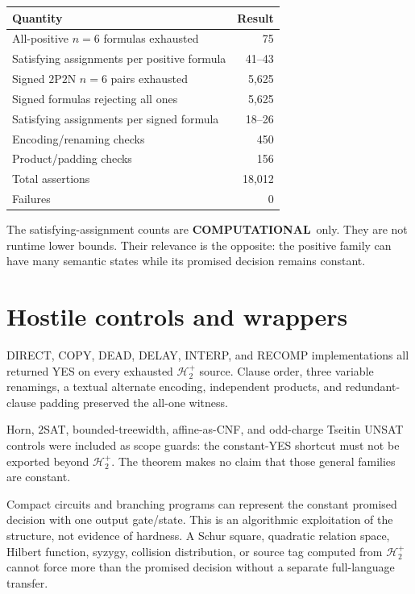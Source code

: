 \documentclass[11pt]{article}
\newcommand{\Hplus}{\mathcal H^{+}_{2}}
\newcommand{\COMP}{\textbf{COMPUTATIONAL}}
\begin{document}
\begin{center}
\begin{tabular}{@{}lr@{}}
\toprule
Quantity & Result\\
\midrule
All-positive $n=6$ formulas exhausted & 75\\
Satisfying assignments per positive formula & 41--43\\
Signed $2$P$2$N $n=6$ pairs exhausted & 5,625\\
Signed formulas rejecting all ones & 5,625\\
Satisfying assignments per signed formula & 18--26\\
Encoding/renaming checks & 450\\
Product/padding checks & 156\\
Total assertions & 18,012\\
Failures & 0\\
\bottomrule
\end{tabular}
\end{center}

The satisfying-assignment counts are \COMP\ only.  They are not runtime
lower bounds.  Their relevance is the opposite: the positive family can
have many semantic states while its promised decision remains constant.

\section{Hostile controls and wrappers}

DIRECT, COPY, DEAD, DELAY, INTERP, and RECOMP implementations all returned
YES on every exhausted $\Hplus$ source.  Clause order, three variable
renamings, a textual alternate encoding, independent products, and
redundant-clause padding preserved the all-one witness.

Horn, $2$SAT, bounded-treewidth, affine-as-CNF, and odd-charge Tseitin
UNSAT controls were included as scope guards: the constant-YES shortcut
must not be exported beyond $\Hplus$.  The theorem makes no claim that
those general families are constant.

Compact circuits and branching programs can represent the constant
promised decision with one output gate/state.  This is an algorithmic
exploitation of the structure, not evidence of hardness.  A Schur square,
quadratic relation space, Hilbert function, syzygy, collision distribution,
or source tag computed from $\Hplus$ cannot force more than the promised
decision without a separate full-language transfer.
\end{document}
